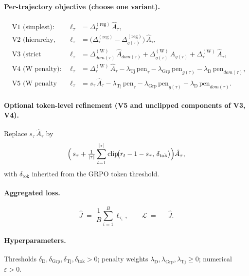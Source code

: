\documentclass[11pt]{article}
\DeclareMathOperator*{\clip}{clip}
\begin{document}
\paragraph{Per-trajectory objective (choose one variant).}
\begin{align*}
&\text{V1 (simplest):}
  &\ell_\tau &= \Delta_\tau^{(\mathrm{reg})}\,\hat A_\tau, \\
&\text{V2 (hierarchy, reg):}
  &\ell_\tau &= \bigl(\Delta_\tau^{(\mathrm{reg})} - \Delta_{g(\tau)}^{(\mathrm{reg})}\bigr)\,\hat A_\tau, \\
&\text{V3 (strict Wasserstein):}
  &\ell_\tau &= \Delta_{dom(\tau)}^{(\mathrm{W})}\,\hat A_{dom(\tau)}
               + \Delta_{g(\tau)}^{(\mathrm{W})}\,\hat A_{g(\tau)}
               + \Delta_\tau^{(\mathrm{W})}\,\hat A_\tau, \\
&\text{V4 (W penalty):}
  &\ell_\tau &= \Delta_\tau^{(\mathrm{W})}\,\hat A_\tau
               - \lambda_{\operatorname{Tj}}\,\mathrm{pen}_\tau
               - \lambda_{\operatorname{Grp}}\,\mathrm{pen}_{g(\tau)}
               - \lambda_{\text{D}}\,\mathrm{pen}_{dom(\tau)}, \\
&\text{V5 (W penalty only):}
  &\ell_\tau &= s_\tau\,\hat A_\tau
               - \lambda_{\operatorname{Tj}}\,\mathrm{pen}_\tau
               - \lambda_{\operatorname{Grp}}\,\mathrm{pen}_{g(\tau)}
               - \lambda_{\text{D}}\,\mathrm{pen}_{dom(\tau)}.
\end{align*}

\paragraph{Optional token-level refinement (V5 and unclipped components of V3, V4).}
Replace $s_\tau\,\hat A_\tau$ by
\[
\Bigl(\,s_\tau + \tfrac{1}{|\tau|}\sum_{t=1}^{|\tau|}\clip\!\bigl(r_t - 1 - s_\tau,\,\delta_{\operatorname{tok}}\bigr)\Bigr)\hat A_\tau,
\]
with $\delta_{\operatorname{tok}}$ inherited from the GRPO token threshold.

\paragraph{Aggregated loss.}
\[
\hat J \;=\; \frac{1}{B}\sum_{i=1}^{B}\ell_{\tau_i},\qquad
\mathcal L \;=\; -\hat J.
\]

\paragraph{Hyperparameters.}
Thresholds $\delta_{\text{D}},\delta_{\operatorname{Grp}},\delta_{\operatorname{Tj}},\delta_{\operatorname{tok}}>0$;
penalty weights $\lambda_{\text{D}},\lambda_{\operatorname{Grp}},\lambda_{\operatorname{Tj}}\geq 0$;
numerical $\varepsilon>0$.
\end{document}
